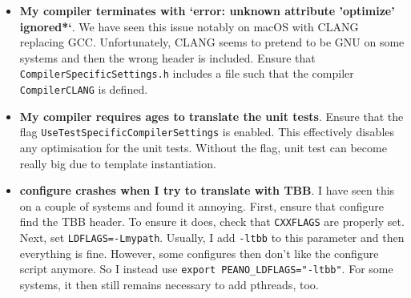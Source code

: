 \begin{itemize}
  \item \textbf{ My compiler terminates with `error: unknown
   attribute 'optimize' ignored*`}. We have seen this issue notably on macOS
   with CLANG replacing GCC. Unfortunately, CLANG seems to pretend to be GNU on
   some systems and then the wrong header is included. Ensure that
   \texttt{CompilerSpecificSettings.h} includes a file such that the compiler
   \linebreak
   \texttt{CompilerCLANG} is defined.
  \item \textbf{ My compiler requires ages to translate the unit tests}. Ensure
  that the flag \linebreak \texttt{UseTestSpecificCompilerSettings} is enabled.
  This effectively disables any optimisation for the unit tests. Without the
  flag, unit test can become really big due to template instantiation.
  \item \textbf{configure crashes when I try to translate with TBB}. I have seen
  this on a couple of systems and found it annoying. First, ensure that configure
  find the TBB header. To ensure it does, check that \texttt{CXXFLAGS} are properly
		set. Next, set \texttt{LDFLAGS=-Lmypath}. Usually, I add \texttt{-ltbb} to 
  this parameter and then everything is fine. However, some configures then don't 
  like the configure script anymore. So I instead use \texttt{export PEANO_LDFLAGS="-ltbb"}. 
  For some systems, it then still remains necessary to add pthreads, too.
\end{itemize}



